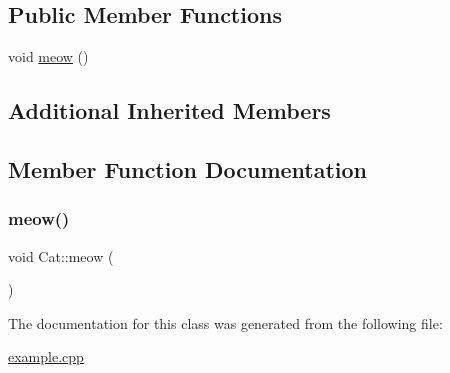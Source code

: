 \subsection*{Public Member Functions}
\begin{DoxyCompactItemize}
\item 
void \hyperlink{classCat_aa770c672b7458b036d7384a6915d9367}{meow} ()
\end{DoxyCompactItemize}
\subsection*{Additional Inherited Members}


\subsection{Member Function Documentation}
\mbox{\label{classCat_aa770c672b7458b036d7384a6915d9367}} 
\subsubsection{\texorpdfstring{meow()}{meow()}}
{\footnotesize\ttfamily void Cat\+::meow (\begin{DoxyParamCaption}{ }\end{DoxyParamCaption})}



The documentation for this class was generated from the following file\+:\begin{DoxyCompactItemize}
\item 
\hyperlink{example_8cpp}{example.\+cpp}\end{DoxyCompactItemize}
